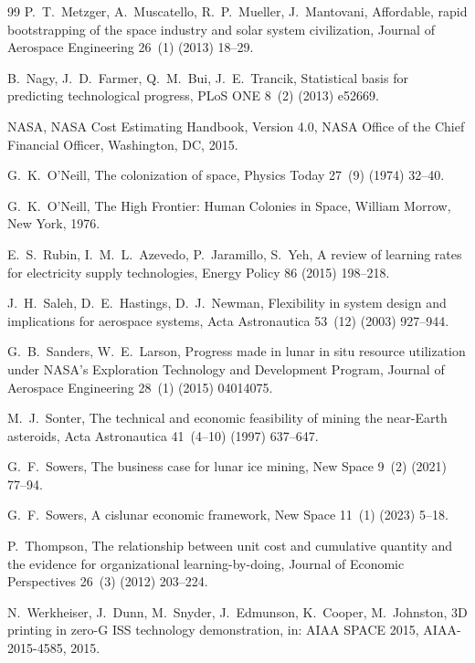 \documentclass[preprint,12pt]{elsarticle}
\begin{document}
\begin{thebibliography}{99}
P.~T.~Metzger, A.~Muscatello, R.~P.~Mueller, J.~Mantovani,
\newblock Affordable, rapid bootstrapping of the space industry and solar system civilization,
\newblock Journal of Aerospace Engineering 26~(1) (2013) 18--29.

B.~Nagy, J.~D.~Farmer, Q.~M.~Bui, J.~E.~Trancik,
\newblock Statistical basis for predicting technological progress,
\newblock PLoS ONE 8~(2) (2013) e52669.

NASA,
\newblock NASA Cost Estimating Handbook, Version 4.0,
\newblock NASA Office of the Chief Financial Officer, Washington, DC, 2015.

G.~K.~O'Neill,
\newblock The colonization of space,
\newblock Physics Today 27~(9) (1974) 32--40.

G.~K.~O'Neill,
\newblock The High Frontier: Human Colonies in Space,
\newblock William Morrow, New York, 1976.

E.~S.~Rubin, I.~M.~L.~Azevedo, P.~Jaramillo, S.~Yeh,
\newblock A review of learning rates for electricity supply technologies,
\newblock Energy Policy 86 (2015) 198--218.

J.~H.~Saleh, D.~E.~Hastings, D.~J.~Newman,
\newblock Flexibility in system design and implications for aerospace systems,
\newblock Acta Astronautica 53~(12) (2003) 927--944.

G.~B.~Sanders, W.~E.~Larson,
\newblock Progress made in lunar in situ resource utilization under NASA's Exploration Technology and Development Program,
\newblock Journal of Aerospace Engineering 28~(1) (2015) 04014075.

M.~J.~Sonter,
\newblock The technical and economic feasibility of mining the near-Earth asteroids,
\newblock Acta Astronautica 41~(4--10) (1997) 637--647.

G.~F.~Sowers,
\newblock The business case for lunar ice mining,
\newblock New Space 9~(2) (2021) 77--94.

G.~F.~Sowers,
\newblock A cislunar economic framework,
\newblock New Space 11~(1) (2023) 5--18.

P.~Thompson,
\newblock The relationship between unit cost and cumulative quantity and the evidence for organizational learning-by-doing,
\newblock Journal of Economic Perspectives 26~(3) (2012) 203--224.

N.~Werkheiser, J.~Dunn, M.~Snyder, J.~Edmunson, K.~Cooper, M.~Johnston,
\newblock 3D printing in zero-G ISS technology demonstration,
\newblock in: AIAA SPACE 2015, AIAA-2015-4585, 2015.


\end{thebibliography}
\end{document}
